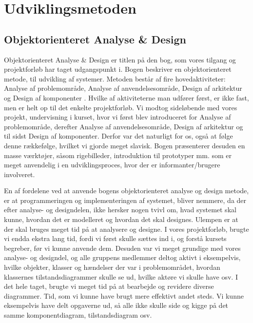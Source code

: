 \chapter{Udviklingsmetoden}
\label{udviklingsmetoden}

\section{Objektorienteret Analyse \& Design}
Objektorienteret Analyse \& Design er titlen på den bog, som vores tilgang og projektforløb har taget udgangspunkt i. Bogen beskriver en objektorienteret metode, til udvikling af systemer. Metoden består af fire hovedaktiviteter: Analyse af problemområde, Analyse af anvendelsesområde, Design af arkitektur og Design af komponenter \cite[p~ 15]{ooad}. Hvilke af aktiviteterne man udfører først, er ikke fast, men er helt op til det enkelte projektforløb. Vi modtog sideløbende med vores projekt, undervisning i kurset, hvor vi først blev introduceret for Analyse af problemområde, derefter Analyse af anvendelsesområde, Design af arkitektur og til sidst Design af komponenter. Derfor var det naturligt for os, også at følge denne rækkefølge, hvilket vi gjorde meget slavisk. Bogen præsenterer desuden en masse værktøjer, såsom rigebilleder, introduktion til prototyper mm. som er meget anvendelig i en udviklingsproces, hvor der er informanter/brugere involveret.

En af fordelene ved at anvende bogens objektorienteret analyse og design metode, er at programmeringen og implementeringen af systemet, bliver nemmere, da der efter analyse- og designdelen, ikke hersker nogen tvivl om, hvad systemet skal kunne, hvordan det er modelleret og hvordan det skal designes. Ulempen er at der skal bruges meget tid på at analysere og designe. I vores projektforløb, brugte vi endda ekstra lang tid, fordi vi først skulle sættes ind i, og forstå kursets begreber, før vi kunne anvende dem. Desuden var vi meget grundige med vores analyse- og designdel, og alle gruppens medlemmer deltog aktivt i eksempelvis, hvilke objekter, klasser og hændelser der var i problemområdet, hvordan klassernes tilstandsdiagrammer skulle se ud, hvilke aktøre vi skulle have osv. I det hele taget, brugte vi meget tid på at bearbejde og revidere diverse diagrammer. Tid, som vi kunne have brugt mere effektivt andet steds. Vi kunne eksempelvis have delt opgaverne ud, så alle ikke skulle side og kigge på det samme komponentdiagram, tilstandsdiagram osv. 

